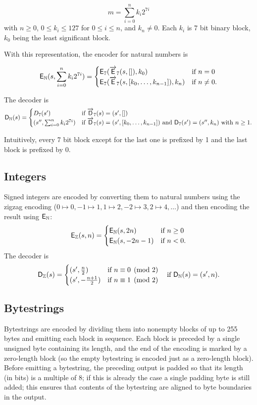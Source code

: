 $$
m = \sum_{i=0}^{n}k_i2^{7i}
$$
with $n \geq 0$, $0 \leq k_i \leq 127$ for $0 \leq i \leq n$, and $k_n \ne 0$.
Each $k_i$ is 7 bit binary block, $k_0$ being the least significant block.

\medskip
\noindent With this representation, the encoder for natural numbers is 

$$
\mathsf{E}_{\mathbb{N}} (s, \sum_{i=0}^{n}k_i2^{7i}) =
\begin{cases}
  \mathsf{E}_7(\overrightarrow{\mathsf{E}}_7(s, []), k_{0}) & \text{if } n = 0 \\
  \mathsf{E}_7(\overrightarrow{\mathsf{E}}_7(s, [k_0, \ldots, k_{n-1}]), k_{n}) & \text{if } n \ne 0.
\end{cases}
$$

\noindent The decoder is
$$
\mathsf{D}_{\mathbb{N}}(s) =
\begin{cases}
  D_7(s') & \text{if $\overrightarrow{\mathsf{D}}_7(s) = (s',[])$} \\
  (s'', \sum_{i=0}^{n}k_i2^{7i}) & \text{if $\overrightarrow{\mathsf{D}}_7(s) = (s', [k_0, \ldots, k_{n-1}])$ and $\mathsf{D}_7(s') = (s'', k_{n})$ with $n\geq 1$}.
\end{cases}
$$

\noindent Intuitively, every 7 bit block except for the last one is prefixed by 1
and the last block is prefixed by 0.

\subsection{Integers}
Signed integers are encoded by converting them to natural numbers using the
zigzag encoding ($0 \mapsto 0, -1 \mapsto 1, 1 \mapsto 2, -2 \mapsto 3, 2
\mapsto 4, \ldots$) and then encoding the result using $\mathsf{E}_{\mathbb{N}}$:
$$
\mathsf{E}_{\mathbb{Z}} (s, n) =
\begin{cases}
  \mathsf{E}_{\mathbb{N}}(s, 2n) & \text{if $n \geq 0$}\\
  \mathsf{E}_{\mathbb{N}}(s, -2n-1) & \text{if $n < 0$}.
\end{cases}
$$
The decoder is
$$
\mathsf{D}_{\mathbb{Z}}(s) =
\begin{cases}
  (s', \frac{n}{2}) & \text{if $n \equiv 0 \pmod 2$}\\
  (s', -\frac{n+1}{2}) & \text{if $n \equiv 1 \pmod 2$}
\end{cases} \quad\text{if $\mathsf{D}_{\mathbb{N}}(s) = (s', n)$}.
$$

\subsection{Bytestrings}  Bytestrings are encoded by dividing them into
nonempty blocks of up to 255 bytes and emitting each block in sequence.  Each
block is preceded by a single unsigned byte containing its length, and the end
of the encoding is marked by a zero-length block (so the empty bytestring is
encoded just as a zero-length block).  Before emitting a bytestring, the
preceding output is padded so that its length (in bits) is a multiple of 8; if
this is already the case a single padding byte is still added; this ensures that
contents of the bytestring are aligned to byte boundaries in the output.

